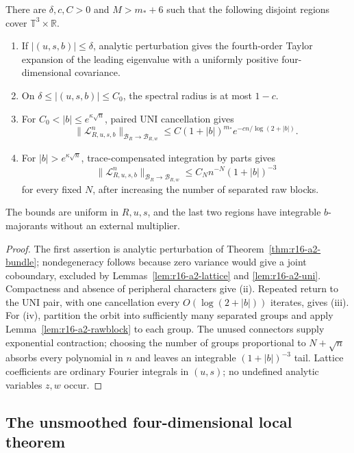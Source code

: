 \begin{theorem}
\label{thm:r16-a2-fourier}
There are \(\delta,c,C>0\) and \(M>m_*+6\) such that the following disjoint
regions cover
\(\mathbb T^3\times\mathbb R\).
\begin{enumerate}[label=(\roman*)]
\item If \(|(u,s,b)|\le\delta\), analytic perturbation gives the fourth-order
Taylor expansion of the leading eigenvalue with a uniformly positive
four-dimensional covariance.
\item On \(\delta\le |(u,s,b)|\le C_0\), the spectral radius is at most
\(1-c\).
\item For \(C_0<|b|\le e^{\kappa\sqrt n}\), paired UNI cancellation gives
\[
 \|\mathcal L_{R,u,s,b}^n\|_{\mathcal B_R\to\mathcal B_{R,w}}
 \le C(1+|b|)^{m_*}
       e^{-cn/\log(2+|b|)}.
\]
\item For \(|b|>e^{\kappa\sqrt n}\), trace-compensated integration by parts
gives
\[
 \|\mathcal L_{R,u,s,b}^n\|_{\mathcal B_R\to\mathcal B_{R,w}}
 \le C_N n^{-N}(1+|b|)^{-3}
\]
for every fixed \(N\), after increasing the number of separated raw blocks.
\end{enumerate}
The bounds are uniform in \(R,u,s\), and the last two regions have integrable
\(b\)-majorants without an external multiplier.
\end{theorem}

\begin{proof}
The first assertion is analytic perturbation of
Theorem~\ref{thm:r16-a2-bundle}; nondegeneracy follows because zero variance
would give a joint coboundary, excluded by
Lemmas~\ref{lem:r16-a2-lattice} and \ref{lem:r16-a2-uni}.  Compactness and
absence of peripheral characters give (ii).  Repeated return to the UNI pair,
with one cancellation every \(O(\log(2+|b|))\) iterates, gives (iii).
For (iv), partition the orbit into sufficiently many separated groups and
apply Lemma~\ref{lem:r16-a2-rawblock} to each group.  The unused connectors
supply exponential contraction; choosing the number of groups proportional
to \(N+\sqrt n\) absorbs every polynomial in \(n\) and leaves an integrable
\((1+|b|)^{-3}\) tail.  Lattice coefficients are ordinary Fourier integrals
in \((u,s)\); no undefined analytic variables \(z,w\) occur.
\end{proof}

\subsection{The unsmoothed four-dimensional local theorem}

